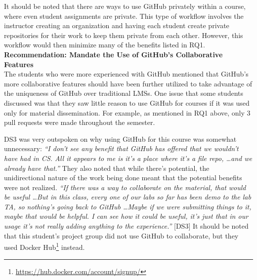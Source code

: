 It should be noted that there are ways to use GitHub privately within a course, where even student assignments are private. This type of workflow involves the instructor creating an organization and having each student create private repositories for their work to keep them private from each other. However, this workflow would then minimize many of the benefits listed in RQ1. \\


\textbf{Recommendation: Mandate the Use of GitHub's Collaborative Features} \\
The students who were more experienced with GitHub mentioned that GitHub's more collaborative features should have been further utilized to take advantage of the uniqueness of GitHub over traditional LMSs. One issue that some students discussed was that they saw little reason to use GitHub for courses if it was used only for material dissemination. For example, as mentioned in RQ1 above, only 3 pull requests were made throughout the semester.

DS3 was very outspoken on why using GitHub for this course was somewhat unnecessary: \textit{``I don't see any benefit that GitHub has offered that we wouldn't have had in CS. All it appears to me is it's a place where it's a file repo, \ldots and we already have that.''} They also noted that while there's potential, the unidirectional nature of the work being done meant that the potential benefits were not realized. \textit{``If there was a way to collaborate on the material, that would be useful \ldots But in this class, every one of our labs so far has been demo to the lab TA, so nothing's going back to GitHub \ldots Maybe if we were submitting things to it, maybe that would be helpful. I can see how it could be useful, it's just that in our usage it's not really adding anything to the experience.''} [DS3] It should be noted that this student's project group did not use GitHub to collaborate, but they used Docker Hub\footnote{\url{https://hub.docker.com/account/signup/}} instead.

